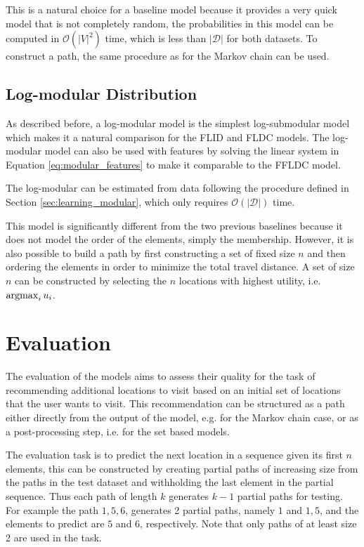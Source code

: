 This is a natural choice for a baseline model because it provides a very quick model that is not completely random, the probabilities in this model can be computed in $\mathcal{O}(|V|^{2})$ time, which is less than $|\mathcal{D}|$ for both datasets. To construct a path, the same procedure as for the Markov chain can be used.

\subsection{Log-modular Distribution}

As described before, a log-modular model is the simplest log-submodular model which makes it a natural comparison for the FLID and FLDC models. The log-modular model can also be used with features by solving the linear system in Equation \eqref{eq:modular_features} to make it comparable to the FFLDC model.

The log-modular can be estimated from data following the procedure defined in Section \ref{sec:learning_modular}, which only requires $\mathcal{O}(|\mathcal{D}|)$ time.

This model is significantly different from the two previous baselines because it does not model the order of the elements, simply the membership. However, it is also possible to build a path by first constructing a set of fixed size $n$ and then ordering the elements in order to minimize the total travel distance. A set of size $n$ can be constructed by selecting the $n$ locations with highest utility, i.e. $\operatorname*{argmax}_{i} u_{i}$.

\section{Evaluation}
\label{sec:evaluation}

The evaluation of the models aims to assess their quality for the task of recommending additional locations to visit based on an initial set of locations that the user wants to visit. This recommendation can be structured as a path either directly from the output of the model, e.g. for the Markov chain case, or as a post-processing step, i.e. for the set based models.

The evaluation task is to predict the next location in a sequence given its first $n$ elements, this can be constructed by creating partial paths of increasing size from the paths in the test dataset and withholding the last element in the partial sequence. Thus each path of length $k$ generates $k-1$ partial paths for testing. For example the path $1,5,6$, generates 2 partial paths, namely $1$ and $1,5$, and the elements  to predict are $5$ and $6$, respectively. Note that only paths of at least size 2 are used in the task.

